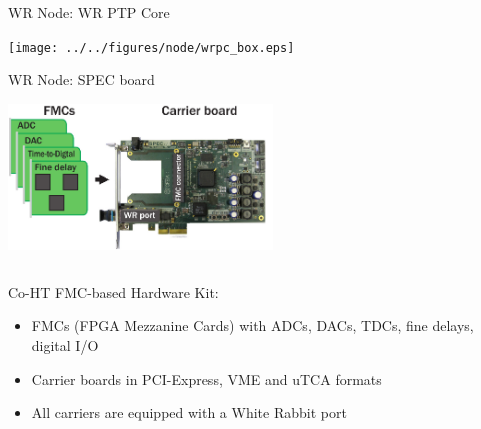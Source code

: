 \documentclass[compress,red]{beamer}
\begin{document}
\begin{frame}{WR Node: WR PTP Core}

    \begin{center}
    \texttt{[image: ../../figures/node/wrpc\_box.eps]}
    \end{center}

\end{frame}
\begin{frame}{WR Node: SPEC board}

    \begin{center}
    \includegraphics[width=7cm]{../../figures/node/shw_kit-1}
    \end{center}

  \begin{columns}[c]

	\begin{block}{Co-HT FMC-based Hardware Kit:}
	  \begin{itemize}
	  \item FMCs (FPGA Mezzanine Cards) with ADCs, DACs, TDCs, fine delays, digital I/O
	  \item Carrier boards in PCI-Express, VME and uTCA formats
	  \item All carriers are equipped with a White Rabbit port
	  \end{itemize}
	\end{block}

  \end{columns}


\end{frame}
\end{document}
